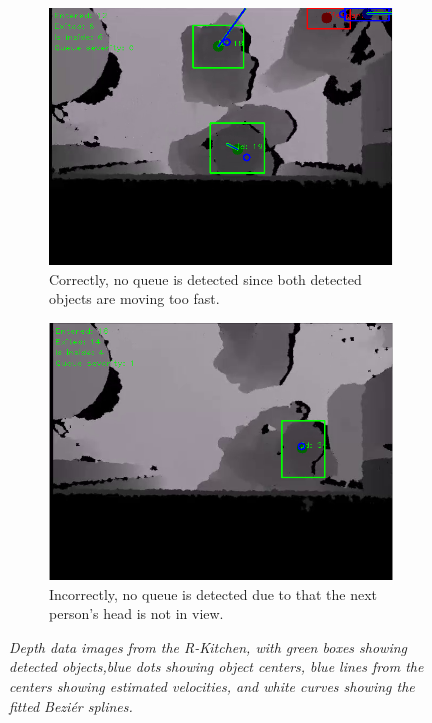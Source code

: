 \begin{figure}[H]
\begin{subfigure}{.4\textwidth}
  \centering
  \includegraphics[width=1.0\linewidth]{images/noQueue2.png}
  \caption{Correctly, no queue is detected since both detected objects are moving too fast.}
  \label{fig:sub5}
\end{subfigure} 
\begin{subfigure}{.4\textwidth}
  \centering
  \includegraphics[width=1.0\linewidth]{images/queueNotDetected.png}
  \caption{Incorrectly, no queue is detected due to that the next person's head is not in view.}
  \label{fig:sub6}
\end{subfigure}%
\caption[Queues]{\textit{Depth data images from the R-Kitchen, with green boxes showing detected objects,blue dots showing object centers, blue lines from the centers showing estimated velocities, and white curves showing the fitted Beziér splines.}}
\label{fig:Queue Detection}
\end{figure}
\newpage
